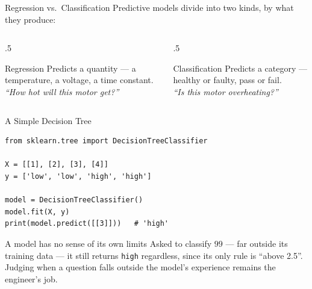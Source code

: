 \documentclass[9pt,aspectratio=169,xcolor=table]{beamer}
\begin{document}
\begin{frame}{Regression vs.\ Classification}
    \leavevmode
    Predictive models divide into two kinds, by what they produce:

    \vspace{2mm}
    \begin{columns}[t]
        \begin{column}{.5\textwidth}
            \begin{block}{Regression}
                \small Predicts a \alert{quantity} --- a temperature, a
                voltage, a time constant. \\
                \emph{``How hot will this motor get?''}
            \end{block}
        \end{column}
        \begin{column}{.5\textwidth}
            \begin{block}{Classification}
                \small Predicts a \alert{category} --- healthy or
                faulty, pass or fail. \\
                \emph{``Is this motor overheating?''}
            \end{block}
        \end{column}
    \end{columns}
\end{frame}

\begin{frame}[fragile]{A Simple Decision Tree}
    \leavevmode
\begin{lstlisting}
from sklearn.tree import DecisionTreeClassifier

X = [[1], [2], [3], [4]]
y = ['low', 'low', 'high', 'high']

model = DecisionTreeClassifier()
model.fit(X, y)
print(model.predict([[3]]))   # 'high'
\end{lstlisting}

    \begin{alertblock}{A model has no sense of its own limits}
        Asked to classify $99$ --- far outside its training data --- it
        still returns \texttt{high} regardless, since its only rule is
        ``above 2.5''. Judging when a question falls outside the
        model's experience remains the engineer's job.
    \end{alertblock}
\end{frame}
\end{document}
